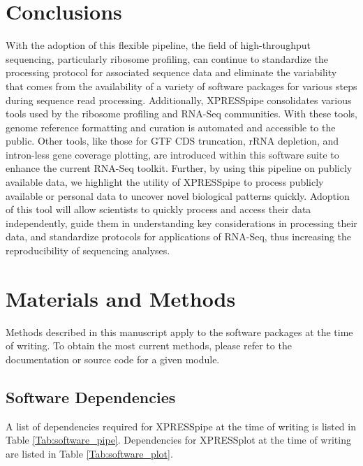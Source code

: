 \documentclass[10pt, oneside]{article}
\begin{document}
\section{Conclusions}
With the adoption of this flexible pipeline, the field of high-throughput sequencing, particularly ribosome profiling, can continue to standardize the processing protocol for associated sequence data and eliminate the variability that comes from the availability of a variety of software packages for various steps during sequence read processing. Additionally, XPRESSpipe consolidates various tools used by the ribosome profiling and RNA-Seq communities. With these tools, genome reference formatting and curation is automated and accessible to the public. Other tools, like those for GTF CDS truncation, rRNA depletion, and intron-less gene coverage plotting, are introduced within this software suite to enhance the current RNA-Seq toolkit. Further, by using this pipeline on publicly available data, we highlight the utility of XPRESSpipe to process publicly available or personal data to uncover novel biological patterns quickly. Adoption of this tool will allow scientists to quickly process and access their data independently, guide them in understanding key considerations in processing their data, and standardize protocols for applications of RNA-Seq, thus increasing the reproducibility of sequencing analyses.


\section{Materials and Methods}
Methods described in this manuscript apply to the software packages at the time of writing. To obtain the most current methods, please refer to the documentation or source code for a given module.

\subsection{Software Dependencies}
A list of dependencies required for XPRESSpipe at the time of writing is listed in Table \ref{Tab:software_pipe}. Dependencies for XPRESSplot at the time of writing are listed in Table \ref{Tab:software_plot}.
\end{document}
